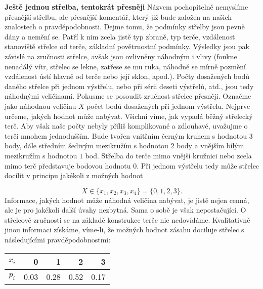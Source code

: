 \begin{mdframed}[style=mdexam]
  \begin{example}\label{mai:exam064}
    \textbf{Ještě jednou střelba, tentokrát přesněji}\newline
    Názvem pochopitelně nemyslíme přesnější střelbu, ale přesnější komentář, který již bude založen
    na našich znalostech o pravděpodobnosti. Dejme tomu, že podmínky střelby jsou pevně dány a
    nemění se. Patří k nim zcela jistě typ zbraně, typ terče, vzdálenost stanoviště střelce od
    terče, základní povětrnostní podmínky. Výsledky jsou pak závislé na zručnosti střelce, avšak
    jsou ovlivněny náhodným i vlivy (foukne nenadálý vítr, střelec se lekne, zatřese se mu ruka,
    náhodně se mírně pozmění vzdálenost ústí hlavně od terče nebo její sklon, apod.). Počty
    dosažených bodů daného střelce při jednom výstřelu, nebo při sérii deseti výstřelů, atd., jsou
    tedy náhodnými veličinami. Pokusme se posoudit zručnost střelce přesněji. Označme jako náhodnou
    veličinu \(X\) počet bodů dosažených při jednom výstřelu. Nejprve určeme, jakých hodnot může
    nabývat. Všichni víme, jak vypadá běžný střelecký terč. Aby však naše počty nebyly příliš
    komplikované a zdlouhavé, uvažujme o terči mnohem jednodušším. Bude tvořen vnitřním černým
    kruhem s hodnotou \(3\) body, dále středním šedivým mezikružím s hodnotou \(2\) body a vnějším
    bílým mezikružím s hodnotou \(1\) bod. Střelba do terče mimo vnější kružnici nebo zcela mimo
    terč představuje bodovou hodnotu \(0\). Při jednom výstřelu tedy může střelec docílit v principu
    jakékoli z možných hodnot

    {\centering
      \captionsetup{type=figure}
      \label{mai:fig070}
    \par}
    \vspace{0.5em}
    \begin{equation*}
      X\in\{x_1, x_2, x_3,x_4\} = \{0,1,2,3\}.
    \end{equation*}
    Informace, jakých hodnot může náhodná veličina nabývat, je jistě nejen cenná, ale je pro
    jakékoli další úvahy nezbytná. Sama o sobě je však nepostačující. O střelcově zručnosti se na
    základě konstrukce terče nic nedovídáme. Kvalitativně jinou informaci získáme, víme-li, že
    možných hodnot zásahu dociluje střelec s následujícími pravděpodobnostmi:

    {\centering
      \begin{tabular}{c|rrrr}
        \(x_i\)    &      0     &      1     &      2     &      3       \\
        \hline
        \(p_i\)    & \num{0.03} & \num{0.28} & \num{0.52} & \num{0.17} 
      \end{tabular}
    \par}


\end{example}
\end{mdframed}
